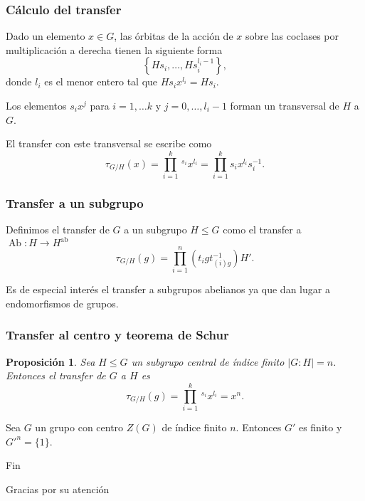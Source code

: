 \documentclass[
	11pt, %
]{beamer}
\DeclareMathOperator{\AbFunctor}{Ab}
\newcommand{\Ab}[1]{#1^\text{ab}}
\newcommand{\ord}[1]{\left|#1\right|}%
\newcommand{\homo}[3]{#1\colon #2\to #3}
\newcommand{\transfer}[2]{\tau_{#1/ #2}}
\newtheorem{proposition}{Proposici\'on}
\begin{document}
\begin{frame}
	\frametitle{Cálculo del transfer}
	Dado un elemento $x\in G$, las órbitas de la acción de $x$ sobre las coclases por multiplicación a derecha tienen la siguiente forma
	$$
		\left\{Hs_i,\ldots,Hs_i^{l_i-1}\right\},
	$$
	donde $l_i$ es el menor entero tal que $Hs_ix^{l_i} = Hs_i$.
	
	Los elementos $s_ix^j$ para $i=1,\ldots k$ y $j=0,\ldots,l_i-1$ forman un transversal de $H$ a $G$.
	
	El transfer con este transversal se escribe como
	$$
		{\transfer G H}(x) = \prod_{i=1}^{k}\,^{s_i}x^{l_i} = \prod_{i=1}^{k}s_ix^{l_i}s_i^{-1}.
	$$
\end{frame}

\begin{frame}
	\frametitle{Transfer a un subgrupo}
	Definimos el transfer de $G$ a un subgrupo $H\leq G$ como el transfer a $\homo \AbFunctor H {\Ab H}$
	$$
		{\transfer G H}(g) = \prod_{i=1}^n \left(t_igt_{(i)g}^{-1}\right)H'.
	$$
	
	Es de especial interés el transfer a subgrupos abelianos ya que dan lugar a endomorfismos de grupos.
\end{frame}

\begin{frame}
	\frametitle{Transfer al centro y teorema de Schur}
	\begin{proposition}
		Sea $H\leq G$ un subgrupo central de índice finito $\ord{G:H} = n$. Entonces el transfer de $G$ a $H$ es
		$$
			{\transfer G H}(g) = \prod_{i=1}^k \,^{s_i}x^{l_i} = x^n.
		$$
	\end{proposition}
	
	\begin{theorem}[Schur]
		Sea $G$ un grupo con centro $Z(G)$ de índice finito $n$. Entonces $G'$ es finito y $G'^n = \{1\}$.
	\end{theorem}
\end{frame}


\begin{frame}[plain] %
	\begin{center}
		{\Huge Fin}
		
		\bigskip\bigskip %
		
		{\LARGE Gracias por su atención}
	\end{center}
\end{frame}

\end{document}
